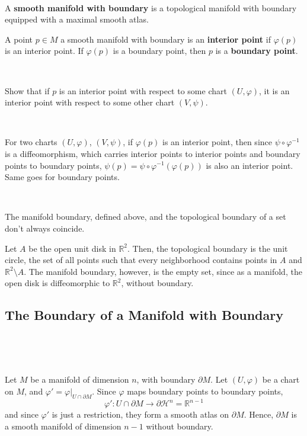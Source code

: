 \documentclass{article}
\begin{document}
\begin{definition}
  \

  A \textbf{smooth manifold with boundary} is a topological manifold with boundary equipped with a maximal smooth atlas.

  A point $p \in M$ a smooth manifold with boundary is an \textbf{interior point} if $\varphi(p)$ is an interior point. If $\varphi(p)$ is a boundary point, then $p$ is a \textbf{boundary point}.

\end{definition}

\begin{proposition}
  \

  Show that if $p$ is an interior point with respect to some chart $(U, \varphi)$, it is an interior point with respect to some other chart $(V, \psi)$.
\end{proposition}

\begin{customproof}
  \

  For two charts $(U, \varphi)$, $(V,\psi)$, if $\varphi(p)$ is an interior point, then since $\psi \circ \varphi ^{-1}$ is a diffeomorphism, which carries interior points to interior points and boundary points to boundary points, $\psi(p) = \psi \circ \varphi ^{-1}(\varphi(p))$ is also an interior point. Same goes for boundary points.
\end{customproof}

\begin{example}
  \

  The manifold boundary, defined above, and the topological boundary of a set don't always coincide.

  Let $A$ be the open unit disk in $\mathbb{R}^2$. Then, the topological boundary is the unit circle, the set of all points such that every neighborhood contains points in $A$ and $\mathbb{R}^2 \setminus A$. The manifold boundary, however, is the empty set, since as a manifold, the open disk is diffeomorphic to $\mathbb{R}^2$, without boundary.
\end{example}

\subsection{The Boundary of a Manifold with Boundary}
\

\begin{example}
  \

  Let $M$ be a manifold of dimension $n$, with boundary $\partial M$. Let $(U,\varphi)$ be a chart on $M$, and $\varphi' = \varphi \vert_{U \cap \partial M}$. Since $\varphi$ maps boundary points to boundary points, $$\varphi': U \cap \partial M \to \partial \mathcal{H}^n = \mathbb{R}^{n-1}$$and since $\varphi'$ is just a restriction, they form a smooth atlas on $\partial M$. Hence, $\partial M$ is a smooth manifold of dimension $n-1$ without boundary.
\end{example}
\end{document}
